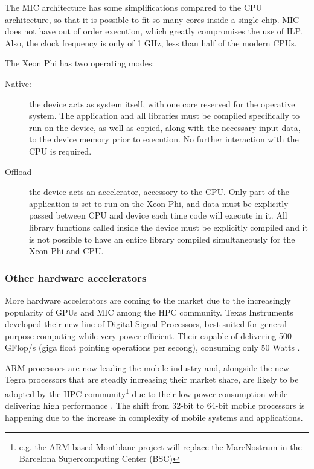 The MIC architecture has some simplifications compared to the CPU architecture, so that it is possible to fit so many cores inside a single chip. MIC does not have out of order execution, which greatly compromises the use of ILP. Also, the clock frequency is only of 1 GHz, less than half of the modern CPUs.

The Xeon Phi has two operating modes:

\begin{description}
	\item[Native:] the device acts as system itself, with one core reserved for the operative system. The application and all libraries must be compiled specifically to run on the device, as well as copied, along with the necessary input data, to the device memory prior to execution. No further interaction with the CPU is required.
	\item[Offload] the device acts an accelerator, accessory to the CPU. Only part of the application is set to run on the Xeon Phi, and data must be explicitly passed between CPU and device each time code will execute in it. All library functions called inside the device must be explicitly compiled and it is not possible to have an entire library compiled simultaneously for the Xeon Phi and CPU.
\end{description}

\subsubsection*{Other hardware accelerators}
\label{OtherAccelerators}

More hardware accelerators are coming to the market due to the increasingly popularity of GPUs and \intel MIC among the HPC community. Texas Instruments developed their new line of Digital Signal Processors, best suited for general purpose computing while very power efficient. Their capable of delivering 500 GFlop/s (giga float pointing operations per secong), consuming only 50 Watts \cite{Texas:DSP}.

ARM processors are now leading the mobile industry and, alongside the new \nvidia Tegra processors \cite{NVIDIA:Tegra} that are steadly increasing their market share, are likely to be adopted by the HPC community\footnote{e.g. the ARM based Montblanc project will replace the MareNostrum in the Barcelona Supercomputing Center (BSC)} due to their low power consumption while delivering high performance \cite{ARM}. The shift from 32-bit to 64-bit mobile processors is happening due to the increase in complexity of mobile systems and applications.

